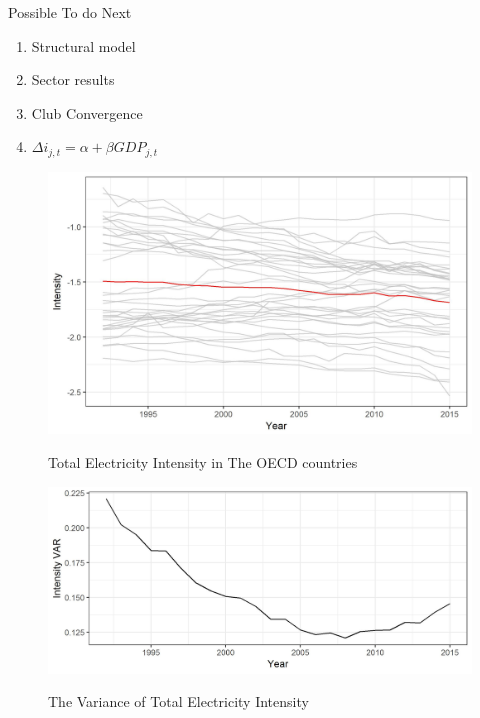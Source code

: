 \documentclass[]{amsart}
\begin{document}
Possible To do Next
\begin{enumerate}
\item Structural model
\item Sector results
\item Club Convergence
\item $\Delta i_{j,t}=\alpha+\beta GDP_{j,t}$
\end{enumerate}

\newpage

\bigskip
\begin{figure}[ht]
  \centering
  \caption{Total Electricity Intensity in The OECD countries}  \includegraphics[height=0.5\textheight,width=1\textwidth]{Intensity_Total_trend}
    \label{Fig_levels}
\end{figure}
\newpage
\begin{figure}[ht]
  \centering
  \caption{The Variance of Total Electricity Intensity}
  \includegraphics[height=0.4\textheight,width=1\textwidth]{OECD_Total_Filtered_VAR}
    \label{Fig_var}
\end{figure}
\bigskip
\newpage

\newpage
 
\end{document}

